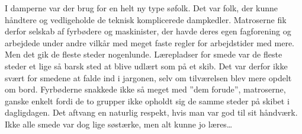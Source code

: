 I damperne var der brug for en helt ny type søfolk. Det var folk, der
kunne håndtere og vedligeholde de teknisk komplicerede dampkedler.
Matroserne fik derfor selskab af fyrbødere og maskinister, der havde
deres egen fagforening og arbejdede under andre vilkår med meget faste
regler for arbejdstider med mere. Men det gik de fleste steder
nogenlunde. Lærepladser for smede var de fleste steder et lige så barsk
sted at blive udlært som på et skib.  Det var derfor ikke svært for
smedene at falde ind i jargonen, selv om tilværelsen blev mere opdelt om
bord. Fyrbøderne snakkede ikke så meget med ''dem forude'', matroserne,
ganske enkelt fordi de to grupper ikke opholdt sig de samme steder på
skibet i dagligdagen. Det aftvang en naturlig respekt, hvis man var god
til sit håndværk. Ikke alle smede var dog lige søstærke, men alt kunne jo
læres\ldots{}


